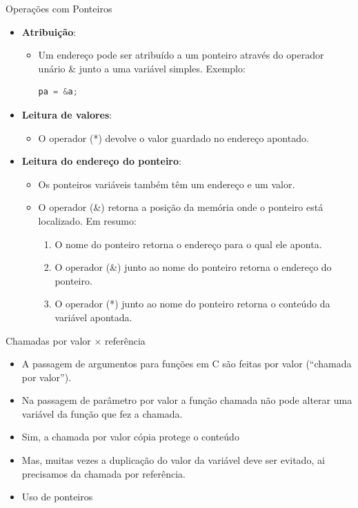 \begin{frame}[fragile,c]{Operações com Ponteiros}
\begin{itemize}[<+->]
  \item \textbf{Atribuição}:
  \begin{itemize}[<+->]
    \item Um endereço pode ser atribuído a um ponteiro através do operador unário \& junto a uma variável simples. Exemplo: 
\begin{lstlisting}[language=C]
  pa = &a;
\end{lstlisting}
  \end{itemize}
  \item \textbf{Leitura de valores}:
  \begin{itemize}[<+->]
    \item O operador (*) devolve o valor guardado no endereço apontado.
  \end{itemize}
  \item \textbf{Leitura do endereço do ponteiro}:
  \begin{itemize}[<+->]
    \item Os ponteiros variáveis também têm um endereço e um valor.
    \item O operador (\&) retorna a posição da memória onde o ponteiro está localizado. Em resumo:        
    \begin{enumerate}[<+->]
      \item O nome do ponteiro retorna o endereço para o qual ele aponta.
      \item O operador (\&) junto ao nome  do ponteiro retorna o endereço do ponteiro.
      \item O operador (*) junto ao nome do ponteiro retorna o conteúdo da variável apontada. 
    \end{enumerate}
  \end{itemize}
\end{itemize}
\end{frame}

\begin{frame}[c]{Chamadas por valor  $\times$ referência}  
  \begin{itemize}
    \item A passagem de argumentos para funções em C são feitas por valor (``chamada por valor'').
    \item Na passagem de parâmetro por valor a função chamada \alert{não pode alterar} uma variável da função que fez a chamada.
    \item Sim, a chamada por valor cópia protege  o conteúdo
    \item Mas, muitas vezes a duplicação do valor da variável deve ser evitado, ai precisamos
    da chamada por referência.
    \item Uso de ponteiros
  \end{itemize}
\end{frame}

